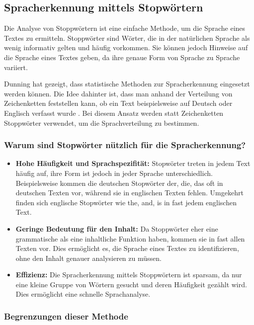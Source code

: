\subsection{Spracherkennung mittels Stopwörtern}

Die Analyse von Stoppwörtern ist eine einfache Methode, um die Sprache eines Textes zu ermitteln. Stoppwörter sind Wörter, die in der natürlichen Sprache als wenig informativ gelten und häufig vorkommen. Sie können jedoch Hinweise auf die Sprache eines Textes geben, da ihre genaue Form von Sprache zu Sprache variiert.

Dunning hat gezeigt, dass statistische Methoden zur Spracherkennung eingesetzt werden können. Die Idee dahinter ist, dass man anhand der Verteilung von Zeichenketten feststellen kann, ob ein Text beispielsweise auf Deutsch oder Englisch verfasst wurde \cite{dunning1994statistical}. Bei diesem Ansatz werden statt Zeichenketten Stoppwörter verwendet, um die Sprachverteilung zu bestimmen.

\subsubsection{Warum sind Stopwörter nützlich für die Spracherkennung?}
\begin{itemize}
    \item \textbf{Hohe Häufigkeit und Sprachspezifität:}  
    Stopwörter treten in jedem Text häufig auf, ihre Form ist jedoch in jeder Sprache unterschiedlich. Beispielsweise kommen die deutschen Stopwörter \glqq der\grqq{}, \glqq die\grqq{}, \glqq das\grqq{} oft in deutschen Texten vor, während sie in englischen Texten fehlen. Umgekehrt finden sich englische Stopwörter wie \glqq the\grqq{}, \glqq and\grqq{}, \glqq is\grqq{} in fast jedem englischen Text.

    \item \textbf{Geringe Bedeutung für den Inhalt:}  
    Da Stoppwörter eher eine grammatische als eine inhaltliche Funktion haben, kommen sie in fast allen Texten vor. Dies ermöglicht es, die Sprache eines Textes zu identifizieren, ohne den Inhalt genauer analysieren zu müssen.

    \item \textbf{Effizienz:}  
    Die Spracherkennung mittels Stoppwörtern ist sparsam, da nur eine kleine Gruppe von Wörtern gesucht und deren Häufigkeit gezählt wird. Dies ermöglicht eine schnelle Sprachanalyse.
\end{itemize}

\subsubsection{Begrenzungen dieser Methode}

